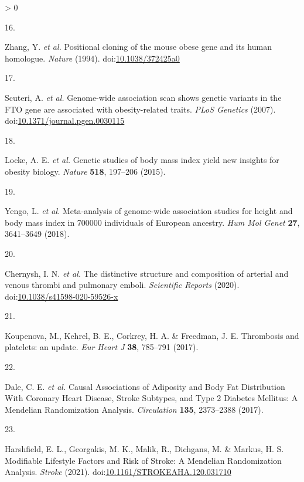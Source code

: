 \documentclass[11pt,twoside]{bristolthesis}
\newlength{\cslhangindent}
\newlength{\csllabelwidth}
\newenvironment{CSLReferences}[2] %
 {%
  \setlength{\parindent}{0pt}
  \ifodd #1 \everypar{\setlength{\hangindent}{\cslhangindent}}\ignorespaces\fi
  \ifnum #2 > 0
  \setlength{\parskip}{#2\baselineskip}
  \fi
 }%
 {}
\newcommand{\CSLLeftMargin}[1]{\parbox[t]{\csllabelwidth}{#1}}
\newcommand{\CSLRightInline}[1]{\parbox[t]{\linewidth - \csllabelwidth}{#1}\break}
\begin{document}
\begin{CSLReferences}{0}{0}
\leavevmode\hypertarget{ref-Zhang1994}{}%
\CSLLeftMargin{16. }
\CSLRightInline{Zhang, Y. \emph{et al.} {Positional cloning of the mouse obese gene and its human homologue}. \emph{Nature} (1994). doi:\href{https://doi.org/10.1038/372425a0}{10.1038/372425a0}}

\leavevmode\hypertarget{ref-Scuteri2007}{}%
\CSLLeftMargin{17. }
\CSLRightInline{Scuteri, A. \emph{et al.} {Genome-wide association scan shows genetic variants in the FTO gene are associated with obesity-related traits}. \emph{PLoS Genetics} (2007). doi:\href{https://doi.org/10.1371/journal.pgen.0030115}{10.1371/journal.pgen.0030115}}

\leavevmode\hypertarget{ref-Locke2015}{}%
\CSLLeftMargin{18. }
\CSLRightInline{Locke, A. E. \emph{et al.} {Genetic studies of body mass index yield new insights for obesity biology}. \emph{Nature} \textbf{518}, 197--206 (2015).}

\leavevmode\hypertarget{ref-Yengo2018}{}%
\CSLLeftMargin{19. }
\CSLRightInline{Yengo, L. \emph{et al.} {Meta-analysis of genome-wide association studies for height and body mass index in 700000 individuals of European ancestry}. \emph{Hum Mol Genet} \textbf{27}, 3641--3649 (2018).}

\leavevmode\hypertarget{ref-Chernysh2020}{}%
\CSLLeftMargin{20. }
\CSLRightInline{Chernysh, I. N. \emph{et al.} {The distinctive structure and composition of arterial and venous thrombi and pulmonary emboli}. \emph{Scientific Reports} (2020). doi:\href{https://doi.org/10.1038/s41598-020-59526-x}{10.1038/s41598-020-59526-x}}

\leavevmode\hypertarget{ref-Koupenova2017a}{}%
\CSLLeftMargin{21. }
\CSLRightInline{Koupenova, M., Kehrel, B. E., Corkrey, H. A. \& Freedman, J. E. {Thrombosis and platelets: an update}. \emph{Eur Heart J} \textbf{38}, 785--791 (2017).}

\leavevmode\hypertarget{ref-Dale2017}{}%
\CSLLeftMargin{22. }
\CSLRightInline{Dale, C. E. \emph{et al.} {Causal Associations of Adiposity and Body Fat Distribution With Coronary Heart Disease, Stroke Subtypes, and Type 2 Diabetes Mellitus: A Mendelian Randomization Analysis}. \emph{Circulation} \textbf{135}, 2373--2388 (2017).}

\leavevmode\hypertarget{ref-Harshfield2021}{}%
\CSLLeftMargin{23. }
\CSLRightInline{Harshfield, E. L., Georgakis, M. K., Malik, R., Dichgans, M. \& Markus, H. S. {Modifiable Lifestyle Factors and Risk of Stroke: A Mendelian Randomization Analysis}. \emph{Stroke} (2021). doi:\href{https://doi.org/10.1161/STROKEAHA.120.031710}{10.1161/STROKEAHA.120.031710}}


\end{CSLReferences}
\end{document}
